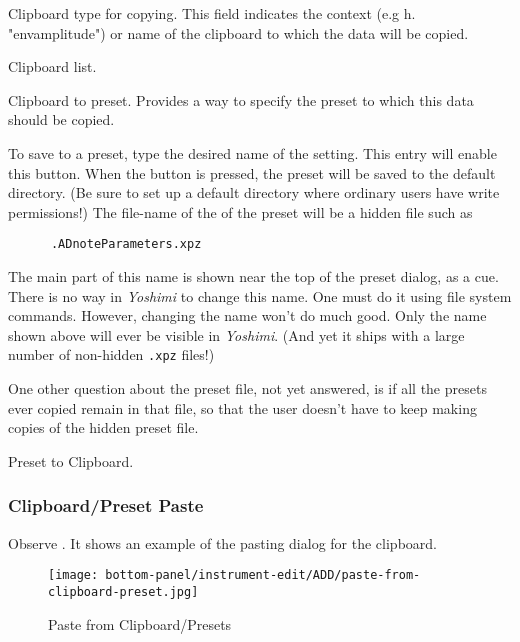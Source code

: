    \setcounter{ItemCounter}{0}      %

   Clipboard type for copying.
   This field indicates the context (e.g h. "envamplitude") or name of the
   clipboard to which the data will be copied.

   Clipboard list.

   Clipboard to preset.
   Provides a way to specify the preset to which this data should be
   copied.

   To save to a preset, type the desired name of the setting.  This entry
   will enable this button.  When the button is pressed, the preset will
   be saved to the default directory.
   (Be sure to set up a default directory where ordinary users have write
   permissions!)
   The file-name of the of the preset will be a hidden file such as

   \begin{verbatim}
      .ADnoteParameters.xpz
   \end{verbatim}

   The main part of this name is shown near the top of the preset dialog, as
   a cue.
   There is no way in \textsl{Yoshimi} to change this name.  One
   must do it using file system commands.  However, changing the name won't
   do much good.  Only the name shown above will ever be visible
   in \textsl{Yoshimi}.
   (And yet it ships with a large number of non-hidden \texttt{.xpz} files!)

   One other question about the preset file, not yet answered, is if all
   the presets ever copied remain in that file, so that the user doesn't
   have to keep making copies of the hidden preset file.

   Preset to Clipboard.

\subsubsection{Clipboard/Preset Paste}
\label{subsubsec:clipboard_paste}

   Observe .
   It shows an example of the pasting dialog for the clipboard.

\begin{figure}[H]
   \centering 
   \texttt{[image: bottom-panel/instrument-edit/ADD/paste-from-clipboard-preset.jpg]}
   \caption[Paste from Clipboard]{Paste from Clipboard/Presets}
   \label{fig:paste_to_clipboard} 
\end{figure}


